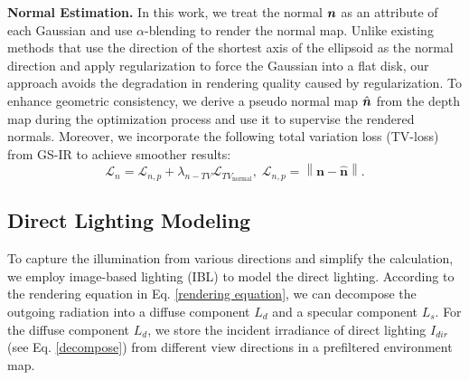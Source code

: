 \documentclass{article} %
\begin{document}
\textbf{Normal Estimation.} In this work, we treat the normal ${\bm{n}}$ as an attribute of each Gaussian and use $\alpha$-blending to render the normal map. Unlike existing methods \citep{gir, chen2024pgsr} that use the direction of the shortest axis of the ellipsoid as the normal direction and apply regularization to force the Gaussian into a flat disk, our approach avoids the degradation in rendering quality caused by regularization. To enhance geometric consistency, we derive a pseudo normal map $\hat{{\bm{n}}}$ from the depth map during the optimization process and use it to supervise the rendered normals. Moreover, we incorporate the following total variation loss (TV-loss) from GS-IR to achieve smoother results:
\begin{equation}
    \mathcal{L}_n=\mathcal{L}_{n,p}+\lambda_{n-T V} \mathcal{L}_{TV_\text{normal}},\; \mathcal{L}_{n,p} = \left\|\boldsymbol{n}-\hat{\boldsymbol{n}}\right\|.
\end{equation}

\subsection{Direct Lighting Modeling}\label{dir}
To capture the illumination from various directions and simplify the calculation, we employ image-based lighting (IBL) to model the direct lighting. According to the rendering equation in Eq. \ref{rendering equation}, we can decompose the outgoing radiation into a diffuse component $L_d$ and a specular component $L_s$. For the diffuse component $L_d$, we store the incident irradiance of direct lighting $I_{dir}$ (see Eq. \ref{decompose}) from different view directions in a prefiltered environment map. 
\end{document}
